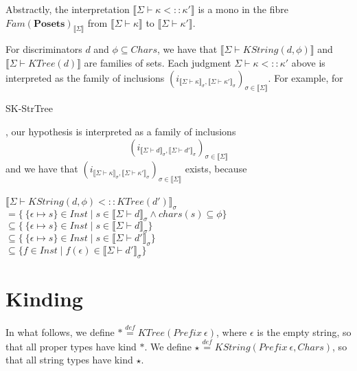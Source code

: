 \documentclass{article}
\newcommand{\mbf}{\mathbf}
\newcommand{\sem}[1]{\llbracket #1 \rrbracket}
\newcommand{\defeq}{\overset{\mathit{def}}{=}}
\begin{document}
Abstractly, the interpretation $\sem{\Sigma \vdash \kappa <:: \kappa'}$ is a mono in the fibre $\mathit{Fam}(\mbf{Posets})_{\sem{\Sigma}}$ from $\sem{\Sigma \vdash \kappa}$ to $\sem{\Sigma \vdash \kappa'}$. 


For discriminators $d$ and $\phi \subseteq \mathit{Chars}$, we have that $\sem{\Sigma \vdash \mathit{KString}(d,\phi)}$ and $\sem{\Sigma \vdash \mathit{KTree}(d)}$ are families of sets. Each judgment $\Sigma \vdash \kappa <:: \kappa'$ above is interpreted as the family of inclusions $(i_{\sem{\Sigma \vdash \kappa}_\sigma,\sem{\Sigma \vdash \kappa'}_\sigma})_{\sigma \in \sem{\Sigma}}$. For example, for \begin{sc}SK-StrTree\end{sc}, our hypothesis is interpreted as a family of inclusions $$(i_{\sem{\Sigma \vdash d}_{\sigma}, \sem{\Sigma \vdash d'}_\sigma})_{\sigma \in \sem{\Sigma}}$$ and we have that $(i_{\sem{\Sigma \vdash \kappa}_\sigma,\sem{\Sigma \vdash \kappa'}_\sigma})_{\sigma \in \sem{\Sigma}}$ exists, because\\~\\
$\sem{\Sigma \vdash \mathit{KString(d,\phi)} <:: \mathit{KTree}(d')}_\sigma$\\
$= \{~\{ \epsilon \mapsto s \} \in \mathit{Inst} \mid s \in \sem{\Sigma \vdash d}_{\sigma} \wedge \mathit{chars}(s) \subseteq \phi \}$\\
$\subseteq \{~\{ \epsilon \mapsto s \} \in \mathit{Inst} \mid s \in \sem{\Sigma \vdash d}_{\sigma} \}$\\
$\subseteq \{~\{ \epsilon \mapsto s \} \in \mathit{Inst} \mid s \in \sem{\Sigma \vdash d'}_{\sigma} \}$\\
$\subseteq \{ f \in \mathit{Inst} \mid f(\epsilon) \in \sem{\Sigma \vdash d'}_{\sigma} \}$

\section*{Kinding}

In what follows, we define $\ast \defeq \mathit{KTree}(\mathit{Prefix}~\epsilon)$, where $\epsilon$ is the empty string, so that all proper types have kind $\ast$. We define $\star \defeq \mathit{KString}(\mathit{Prefix}~\epsilon, \mathit{Chars})$, so that all string types have kind $\star$.
\end{document}
